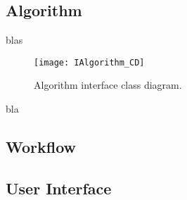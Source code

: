 \subsection{Algorithm}
blas

\begin{figure}[h]
  \centering
      \texttt{[image: IAlgorithm\_CD]}
  \caption{Algorithm interface class diagram.}
  \label{fig:IAlgorithm_CD}
\end{figure}

bla

\subsection{Workflow}

\subsection{User Interface}
